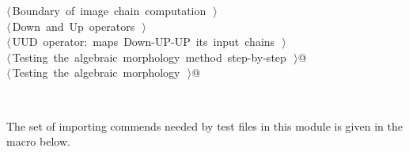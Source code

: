 \documentclass[11pt,oneside]{article}	%
\begin{document}
\begin{flushleft}
\begin{minipage}{\linewidth}
\begin{list}{}{}
\mbox{}\verb@@\hbox{$\langle\,$Boundary of image chain computation\nobreak\ {\footnotesize {}}$\,\rangle$}\verb@@\\
\mbox{}\verb@@\hbox{$\langle\,$Down and Up operators\nobreak\ {\footnotesize {}}$\,\rangle$}\verb@@\\
\mbox{}\verb@@\hbox{$\langle\,$UUD operator: maps Down-UP-UP its input chains\nobreak\ {\footnotesize {}}$\,\rangle$}\verb@@\\
\mbox{}\verb@@\hbox{$\langle\,$Testing the algebraic morphology method step-by-step\nobreak\ {\footnotesize {}}$\,\rangle$}\verb@ @\\
\mbox{}\verb@@\hbox{$\langle\,$Testing the algebraic morphology\nobreak\ {\footnotesize {}}$\,\rangle$}\verb@ @\\
\mbox{}\verb@@{\NWsep}
\end{list}
\vspace{-2ex}
\end{minipage}\\[4ex]
\end{flushleft}

The set of importing commends needed by test files in this module is given in the macro below.
\end{document}
